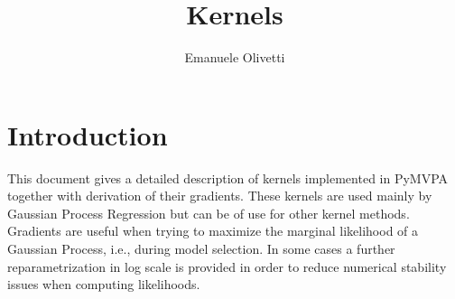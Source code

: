 \documentclass[a4paper,11pt]{article}
\title{Kernels}
\author{Emanuele Olivetti}
\begin{document}
\maketitle

\section{Introduction}
This document gives a detailed description of kernels implemented in
PyMVPA together with derivation of their gradients. These kernels are
used mainly by Gaussian Process Regression but can be of use for other
kernel methods. Gradients are useful when trying to maximize the
marginal likelihood of a Gaussian Process, i.e., during model
selection. In some cases a further reparametrization in log scale is
provided in order to reduce numerical stability issues when computing
likelihoods.
\end{document}
